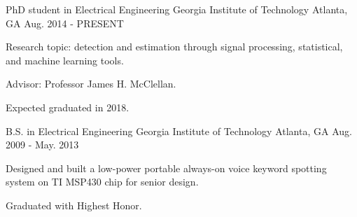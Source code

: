 

\begin{cventries}

  \cventry
    {PhD student in Electrical Engineering} %
    {Georgia Institute of Technology} %
    {Atlanta, GA} %
    {Aug. 2014 - PRESENT} %
    {
      \begin{cvitems} %
        \item {Research topic: detection and estimation through signal processing, statistical, and machine learning tools.}
        \item {Advisor: Professor James H. McClellan.}
        \item {Expected graduated in 2018.}
      \end{cvitems}
    }
    
  \cventry
    {B.S. in Electrical Engineering} %
    {Georgia Institute of Technology} %
    {Atlanta, GA} %
    {Aug. 2009 - May. 2013} %
    {
      \begin{cvitems} %
        \item {Designed and built a low-power portable always-on voice keyword spotting system on TI MSP430 chip for senior design.}
        \item {Graduated with Highest Honor.}
      \end{cvitems}
    }

\end{cventries}

